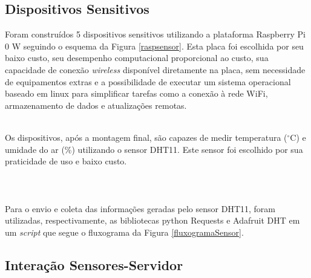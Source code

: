 \subsection{Dispositivos Sensitivos}
\quad Foram construídos 5 dispositivos sensitivos utilizando a plataforma Raspberry Pi 0 W seguindo o esquema da Figura \ref{raspsensor}. Esta placa
foi escolhida por seu baixo custo, seu desempenho computacional proporcional ao custo, sua capacidade de conexão \textit{wireless} disponível diretamente na placa, sem necessidade de equipamentos extras e a possibilidade de executar um sistema operacional baseado em linux para simplificar tarefas como a conexão à rede WiFi, armazenamento de dados e atualizações remotas.

\\\null \quad Os dispositivos, após a montagem final, são capazes de medir temperatura ($^\circ$C) e umidade do ar (\%) utilizando o sensor DHT11. Este sensor foi escolhido
por sua praticidade de uso e baixo custo.
\\\\\\
\\\null \quad Para o envio e coleta das informações geradas pelo sensor DHT11, foram utilizadas, respectivamente, as bibliotecas python Requests \cite{Requests} e Adafruit DHT \cite{AdafruitDHT} em um \textit{script} que segue o fluxograma da Figura \ref{fluxogramaSensor}.

\newpage
\subsection{Interação Sensores-Servidor}

